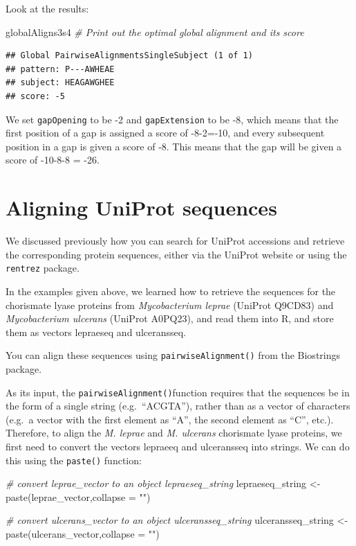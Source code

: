 \documentclass[
]{book}
\newenvironment{Shaded}{\begin{snugshade}}{\end{snugshade}}
\newcommand{\AttributeTok}[1]{\textcolor[rgb]{0.77,0.63,0.00}{#1}}
\newcommand{\CommentTok}[1]{\textcolor[rgb]{0.56,0.35,0.01}{\textit{#1}}}
\newcommand{\FunctionTok}[1]{\textcolor[rgb]{0.00,0.00,0.00}{#1}}
\newcommand{\NormalTok}[1]{#1}
\newcommand{\OtherTok}[1]{\textcolor[rgb]{0.56,0.35,0.01}{#1}}
\newcommand{\StringTok}[1]{\textcolor[rgb]{0.31,0.60,0.02}{#1}}
\begin{document}
Look at the results:

\begin{Shaded}
\begin{Highlighting}[]
\NormalTok{globalAligns3s4 }\CommentTok{\# Print out the optimal global alignment and its score}
\end{Highlighting}
\end{Shaded}

\begin{verbatim}
## Global PairwiseAlignmentsSingleSubject (1 of 1)
## pattern: P---AWHEAE
## subject: HEAGAWGHEE
## score: -5
\end{verbatim}

We set \texttt{gapOpening} to be -2 and \texttt{gapExtension} to be -8, which means that the first position of a gap is assigned a score of -8-2=-10, and every subsequent position in a gap is given a score of -8. This means that the gap will be given a score of -10-8-8 = -26.

\hypertarget{aligning-uniprot-sequences}{%
\section{Aligning UniProt sequences}\label{aligning-uniprot-sequences}}

We discussed previously how you can search for UniProt accessions and retrieve the corresponding protein sequences, either via the UniProt website or using the \texttt{rentrez} package.

In the examples given above, we learned how to retrieve the sequences for the chorismate lyase proteins from \emph{Mycobacterium leprae} (UniProt Q9CD83) and \emph{Mycobacterium ulcerans} (UniProt A0PQ23), and read them into R, and store them as vectors lepraeseq and ulceransseq.

You can align these sequences using \texttt{pairwiseAlignment()} from the Biostrings package.

As its input, the \texttt{pairwiseAlignment()}function requires that the sequences be in the form of a single string (e.g.~``ACGTA''), rather than as a vector of characters (e.g.~a vector with the first element as ``A'', the second element as ``C'', etc.). Therefore, to align the \emph{M. leprae} and \emph{M. ulcerans} chorismate lyase proteins, we first need to convert the vectors lepraeeq and ulceransseq into strings. We can do this using the \texttt{paste()} function:

\begin{Shaded}
\begin{Highlighting}[]
\CommentTok{\# convert leprae\_vector to an object lepraeseq\_string}
\NormalTok{lepraeseq\_string }\OtherTok{\textless{}{-}}\FunctionTok{paste}\NormalTok{(leprae\_vector,}\AttributeTok{collapse =} \StringTok{""}\NormalTok{)    }

\CommentTok{\# convert ulcerans\_vector to an object ulceransseq\_string}
\NormalTok{ulceransseq\_string }\OtherTok{\textless{}{-}}\FunctionTok{paste}\NormalTok{(ulcerans\_vector,}\AttributeTok{collapse =} \StringTok{""}\NormalTok{) }
\end{Highlighting}
\end{Shaded}
\end{document}
